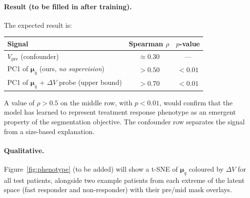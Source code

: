 \paragraph{Result (to be filled in after training).}
The expected result is:
\begin{center}
\begin{tabular}{lcc}
\toprule
Signal & Spearman $\rho$ & $p$-value \\
\midrule
$V_{\text{pre}}$ (confounder) & $\approx 0.30$ & --- \\
PC1 of $\boldsymbol{\mu}_q$ (ours, \emph{no supervision}) & $> 0.50$ & $< 0.01$ \\
PC1 of $\boldsymbol{\mu}_q$ + $\Delta V$ probe (upper bound) & $> 0.70$ & $< 0.01$ \\
\bottomrule
\end{tabular}
\end{center}
A value of $\rho > 0.5$ on the middle row, with $p < 0.01$, would confirm
that the model has learned to represent treatment response phenotype as an
emergent property of the segmentation objective.  The confounder row
separates the signal from a size-based explanation.

\paragraph{Qualitative.}
Figure~\ref{fig:phenotype} (to be added) will show a t-SNE of
$\boldsymbol{\mu}_q$ coloured by $\Delta V$ for all test patients, alongside
two example patients from each extreme of the latent space
(fast responder and non-responder) with their pre/mid mask overlays.
